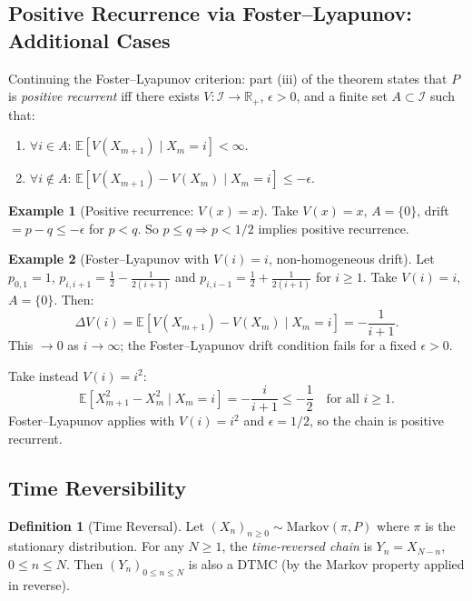 \documentclass[12pt, a4paper]{article}
\theoremstyle{definition}
\newtheorem{definition}{Definition}[section]
\newtheorem{example}{Example}[section]
\theoremstyle{plain}
\newcommand{\EE}{\mathbb{E}}
\begin{document}
\subsection{Positive Recurrence via Foster--Lyapunov: Additional Cases}

Continuing the Foster--Lyapunov criterion: part (iii) of the theorem states that $P$ is \emph{positive recurrent} iff there exists $V:\mathcal{I}\to\mathbb{R}_+$, $\epsilon>0$, and a finite set $A\subset\mathcal{I}$ such that:
\begin{enumerate}[label=(\alph*)]
  \item $\forall i\in A$: $\EE[V(X_{m+1})\mid X_m=i]<\infty$.
  \item $\forall i\notin A$: $\EE[V(X_{m+1})-V(X_m)\mid X_m=i]\le -\epsilon$.
\end{enumerate}

\begin{example}[Positive recurrence: $V(x)=x$]
Take $V(x)=x$, $A=\{0\}$, drift $= p-q \le -\epsilon$ for $p<q$. So $p\le q \Rightarrow p<1/2$ implies positive recurrence.
\end{example}

\begin{example}[Foster--Lyapunov with $V(i)=i$, non-homogeneous drift]
Let $p_{0,1}=1$, $p_{i,i+1}=\tfrac{1}{2}-\tfrac{1}{2(i+1)}$ and $p_{i,i-1}=\tfrac{1}{2}+\tfrac{1}{2(i+1)}$ for $i\ge 1$. Take $V(i)=i$, $A=\{0\}$. Then:
\[
  \Delta V(i) = \EE[V(X_{m+1})-V(X_m)\mid X_m=i] = -\frac{1}{i+1}.
\]
This $\to 0$ as $i\to\infty$; the Foster--Lyapunov drift condition fails for a fixed $\epsilon>0$.

Take instead $V(i)=i^2$:
\[
  \EE[X_{m+1}^2 - X_m^2\mid X_m=i] = -\frac{i}{i+1} \le -\frac{1}{2} \quad\text{for all }i\ge 1.
\]
Foster--Lyapunov applies with $V(i)=i^2$ and $\epsilon=1/2$, so the chain is positive recurrent.
\end{example}

\subsection{Time Reversibility}

\begin{definition}[Time Reversal]
Let $(X_n)_{n\ge 0}\sim\text{Markov}(\pi,P)$ where $\pi$ is the stationary distribution. For any $N\ge 1$, the \emph{time-reversed chain} is $Y_n = X_{N-n}$, $0\le n\le N$. Then $(Y_n)_{0\le n\le N}$ is also a DTMC (by the Markov property applied in reverse).
\end{definition}
\end{document}
